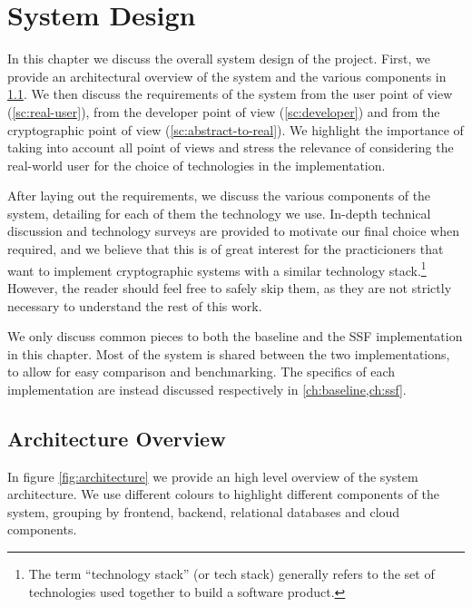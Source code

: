 \chapter{System Design}\label{ch:setup}

In this chapter we discuss the overall system design of the project.
First, we provide an architectural overview
of the system and the various components in \cref{sc:architectural-overview}.
We then discuss the requirements of the system from the user point of view
(\cref{sc:real-user}), from the developer point of view
(\cref{sc:developer}) and from the cryptographic point of view
(\cref{sc:abstract-to-real}). We highlight the importance
of taking into account all point of views and stress the 
relevance of considering the real-world
user for the choice of technologies in the implementation. 

After laying out the requirements, we discuss the various
components of the system, detailing for each of them
the technology we use. In-depth technical
discussion and technology surveys are provided
to motivate our final choice when required, and we believe
that this is of great interest for the practicioners
that want to implement cryptographic systems with 
a similar technology stack.\footnote{The term ``technology stack'' (or tech stack) generally refers to the set of technologies used together to build a software product.}
However, the reader should feel free to safely skip
them, as they are not strictly necessary to understand 
the rest of this work.

We only discuss common
pieces to both the baseline and the SSF implementation
in this chapter. Most of the system is
shared between the two implementations, to allow
for easy comparison and benchmarking.
The specifics of each implementation are instead discussed respectively in \cref{ch:baseline,ch:ssf}.

\section{Architecture Overview}\label{sc:architectural-overview}

In figure \cref{fig:architecture} we provide an high level overview of the system architecture.
We use different colours to highlight different components of the system, grouping
by frontend, backend, relational databases and cloud components.

